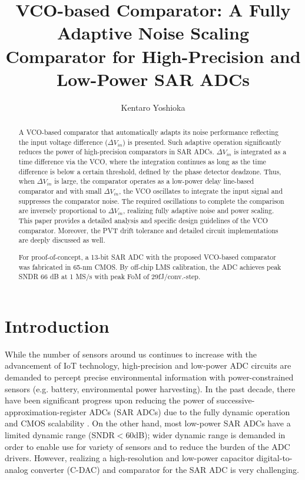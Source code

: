 \documentclass[journal]{IEEEtran}
\title{\LARGE \bf
VCO-based Comparator: A Fully Adaptive Noise Scaling Comparator for High-Precision and Low-Power SAR ADCs
}
\author{Kentaro Yoshioka%
}
\begin{document}
\maketitle
\thispagestyle{empty}
\pagestyle{empty}

\begin{abstract}
A VCO-based comparator that automatically adapts its noise performance reflecting the input voltage difference ($\Delta V_{in}$) is presented. Such adaptive operation significantly reduces the power of high-precision comparators in SAR ADCs.
$\Delta V_{in}$ is integrated as a time difference via the VCO, where the integration continues as long as the time difference is below a certain threshold, defined by the phase detector deadzone.
Thus, when $\Delta V_{in}$ is large, the comparator operates as a low-power delay line-based comparator and with small $\Delta V_{in}$, the VCO oscillates to integrate the input signal and suppresses the comparator noise.
The required oscillations to complete the comparison are inversely proportional to $\Delta V_{in}$, realizing fully adaptive noise and power scaling. 
This paper provides a detailed analysis and specific design guidelines of the VCO comparator. Moreover, the PVT drift tolerance and detailed circuit implementations are deeply discussed as well.

For proof-of-concept, a 13-bit SAR ADC with the proposed VCO-based comparator was fabricated in 65-nm CMOS. By off-chip LMS calibration, the ADC achieves peak SNDR 66 dB at 1 MS/s with peak FoM of 29fJ/conv.-step.


\end{abstract}

\section{Introduction}
While the number of sensors around us continues to increase with the advancement of IoT technology, high-precision and low-power ADC circuits are demanded to percept precise environmental information with power-constrained sensors (e.g. battery, environmental power harvesting). In the past decade, there have been significant progress upon reducing the power of successive-approximation-register ADCs (SAR ADCs) due to the fully dynamic operation and CMOS scalability \cite{van201010,shikata20120,yoshioka201010,yoshioka20148,zhu201010,tai201411}. On the other hand, most low-power SAR ADCs have a limited dynamic range (SNDR$<$60dB); wider dynamic range is demanded in order to enable use for variety of sensors and to reduce the burden of the ADC drivers. However, realizing a high-resolution and low-power capacitor digital-to-analog converter (C-DAC) and comparator for the SAR ADC is very challenging.
\end{document}
